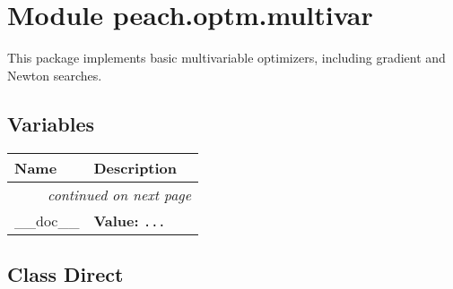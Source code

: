 %
%
%


\section{Module peach.optm.multivar}

    \label{peach:optm:multivar}

This package implements basic multivariable optimizers, including gradient and
Newton searches.


  \subsection{Variables}

\begin{longtable}{|p{}|p{}|l}
\cline{1-2}
\cline{1-2} \centering \textbf{Name} & \centering \textbf{Description}& \\
\cline{1-2}
\endhead\cline{1-2}\multicolumn{3}{r}{\small\textit{continued on next page}}\\\endfoot\cline{1-2}
\endlastfoot\raggedright \_\-\_\-d\-o\-c\-\_\-\_\- & \raggedright \textbf{Value:} 
{\tt \texttt{...}}&\\
\cline{1-2}
\end{longtable}



\subsection{Class Direct}

